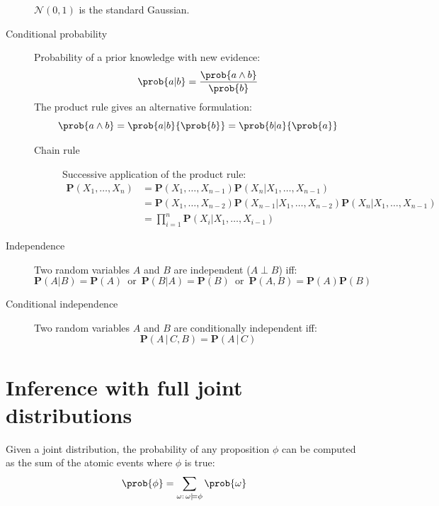 \begin{description}
\begin{descriptionlist}
                $\mathcal{N}(0, 1)$ is the standard Gaussian.
        \end{descriptionlist}

    \item[Conditional probability] 
        Probability of a prior knowledge with new evidence:
        \[ \prob{a \vert b} = \frac{\prob{a \land b}}{\prob{b}} \]
        The product rule gives an alternative formulation:
        \[ \prob{a \land b} = \prob{a \vert b}{\prob{b}} = \prob{b \vert a}{\prob{a}} \]

        \begin{description}
            \item[Chain rule] 
                Successive application of the product rule:
                \[ 
                    \begin{split}
                        \textbf{P}(X_1, \dots, X_n) &= \textbf{P}(X_1, \dots, X_{n-1}) \textbf{P}(X_n \vert X_1, \dots, X_{n-1}) \\
                            &= \textbf{P}(X_1, \dots, X_{n-2}) \textbf{P}(X_{n-1} \vert X_1, \dots, X_{n-2}) \textbf{P}(X_n \vert X_1, \dots, X_{n-1}) \\
                            &= \prod_{i=1}^{n} \textbf{P}(X_i \vert X_1, \dots, X_{i-1})
                    \end{split}  
                \]
        \end{description}

    \item[Independence] 
        Two random variables $A$ and $B$ are independent ($A \perp B$) iff:
        \[ 
            \textbf{P}(A \vert B) = \textbf{P}(A) \,\text{ or }\, 
            \textbf{P}(B \vert A) = \textbf{P}(B) \,\text{ or }\,
            \textbf{P}(A, B) = \textbf{P}(A)\textbf{P}(B)
        \]

    \item[Conditional independence] 
        Two random variables $A$ and $B$ are conditionally independent iff:
        \[ \textbf{P}(A \,\vert\, C, B) = \textbf{P}(A \,\vert\, C) \]
\end{description}



\section{Inference with full joint distributions}
Given a joint distribution, the probability of any proposition $\phi$ 
can be computed as the sum of the atomic events where $\phi$ is true:
\[ \prob{\phi} = \sum_{\omega:\, \omega \models \phi} \prob{\omega} \]

